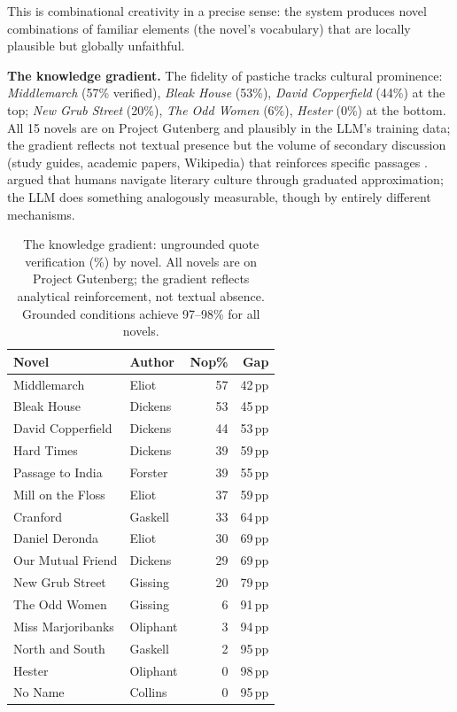 \documentclass[letterpaper]{article}
\begin{document}
This is combinational creativity in a precise sense: the system
produces novel combinations of familiar elements (the novel's
vocabulary) that are locally plausible but globally unfaithful.

\textbf{The knowledge gradient.}  The fidelity of pastiche tracks
cultural prominence: \emph{Middlemarch} (57\% verified),
\emph{Bleak House} (53\%), \emph{David Copperfield} (44\%) at the
top; \emph{New Grub Street} (20\%), \emph{The Odd Women} (6\%),
\emph{Hester} (0\%) at the bottom.  All 15 novels are on Project
Gutenberg and plausibly in the LLM's training data; the gradient
reflects not textual presence but the volume of secondary discussion
(study guides, academic papers, Wikipedia) that reinforces specific
passages \cite{carlini2021extracting,carlini2023quantifying}.
\citeauthor{bayard2007comment}~ argued
that humans navigate literary culture through graduated approximation;
the LLM does something analogously measurable, though by entirely
different mechanisms.

\begin{table}[t]
\centering
\small
\caption{The knowledge gradient: ungrounded quote verification (\%)
by novel.  All novels are on Project Gutenberg; the gradient reflects
analytical reinforcement, not textual absence.  Grounded conditions
achieve 97--98\% for all novels.}
\label{tab:gradient}
\begin{tabular}{llr@{\hspace{6pt}}r}
\toprule
Novel & Author & Nop\% & Gap \\
\midrule
Middlemarch & Eliot & 57 & 42\,pp \\
Bleak House & Dickens & 53 & 45\,pp \\
David Copperfield & Dickens & 44 & 53\,pp \\
Hard Times & Dickens & 39 & 59\,pp \\
Passage to India & Forster & 39 & 55\,pp \\
Mill on the Floss & Eliot & 37 & 59\,pp \\
Cranford & Gaskell & 33 & 64\,pp \\
Daniel Deronda & Eliot & 30 & 69\,pp \\
Our Mutual Friend & Dickens & 29 & 69\,pp \\
New Grub Street & Gissing & 20 & 79\,pp \\
The Odd Women & Gissing & 6 & 91\,pp \\
Miss Marjoribanks & Oliphant & 3 & 94\,pp \\
North and South & Gaskell & 2 & 95\,pp \\
Hester & Oliphant & 0 & 98\,pp \\
No Name & Collins & 0 & 95\,pp \\
\bottomrule
\end{tabular}
\end{table}
\end{document}
